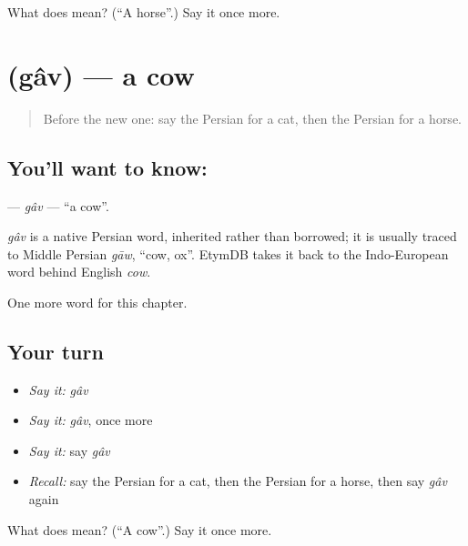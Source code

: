 \begin{tcolorbox}[breakable,colback=teal!4,colframe=teal!35!black,title={Before you move on}]
What does  mean? (\textquotedblleft{}A horse\textquotedblright{}.) Say it once more.
\end{tcolorbox}
\section[\texorpdfstring{\fa{گاو} (gâv)}{گاو (gâv)}]{ (gâv) — a cow}

\label{lesson:FA-C55-gav}



\begin{quote}
Before the new one: say the Persian for a cat, then the Persian for a horse.
\end{quote}

\subsection*{You'll want to know: }
\textbf{} — \emph{gâv} — \textquotedblleft{}a cow\textquotedblright{}.

\begin{cousinweb}
\emph{gâv} is a native Persian word, inherited rather than borrowed; it is usually traced to Middle Persian \emph{gāw}, \textquotedblleft{}cow, ox\textquotedblright{}. EtymDB takes it back to the Indo-European word behind English \emph{cow}.
\end{cousinweb}

\begin{grammarlens}[title={What you've built}]
One more word for this chapter.
\end{grammarlens}

\subsection*{Your turn}
\begin{itemize}
\raggedright
  \item \emph{Say it:} \emph{gâv}
  \item \emph{Say it:} \emph{gâv}, once more
  \item \emph{Say it:} say \emph{gâv}
  \item \emph{Recall:} say the Persian for a cat, then the Persian for a horse, then say \emph{gâv} again
\end{itemize}

\begin{tcolorbox}[breakable,colback=teal!4,colframe=teal!35!black,title={Before you move on}]
What does  mean? (\textquotedblleft{}A cow\textquotedblright{}.) Say it once more.
\end{tcolorbox}
